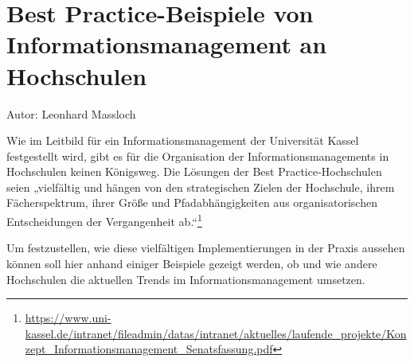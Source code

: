 \chapter{Best Practice-Beispiele von Informationsmanagement an Hochschulen}

Autor: Leonhard Massloch

Wie im Leitbild für ein Informationsmanagement der Universität Kassel festgestellt wird, gibt es für die Organisation der Informationsmanagements in Hochschulen keinen Königsweg. Die Lösungen der Best Practice-Hochschulen seien „vielfältig und hängen von den strategischen Zielen der Hochschule, ihrem Fächerspektrum, ihrer Größe und Pfadabhängigkeiten aus organisatorischen Entscheidungen der Vergangenheit ab.“\footnote{\url{https://www.uni-kassel.de/intranet/fileadmin/datas/intranet/aktuelles/laufende_projekte/Konzept_Informationsmanagement_Senatsfassung.pdf}}

Um festzustellen, wie diese vielfältigen Implementierungen in der Praxis aussehen können soll hier anhand einiger Beispiele gezeigt werden, ob und wie andere Hochschulen die aktuellen Trends im Informationsmanagement umsetzen.




